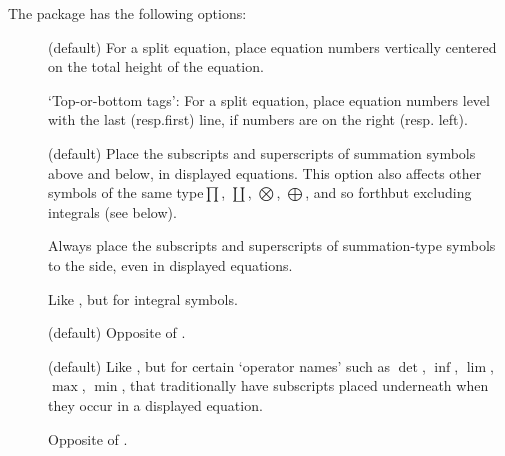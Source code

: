 \documentclass[leqno,titlepage,openany]{amsldoc}[1999/12/13]
\begin{document}
The  package has the following options:
\begin{description}

\item[] (default) For a split equation, place equation
numbers vertically centered
on the total height of the equation.

\item[] `Top-or-bottom tags': For a split equation, place
equation numbers level with
the last (resp.\@ first) line, if numbers are on the right (resp.\@
left).

\item[] (default) Place the subscripts and
superscripts\relax
{} of summation symbols
above and below, in displayed equations. This option also affects other
symbols of the same type\mdash $\prod$, $\coprod$, $\bigotimes$,
$\bigoplus$, and so forth\mdash but excluding integrals (see below).

\item[] Always place the subscripts and superscripts of
summation-type symbols to the side, even in displayed equations.

\item[] Like , but for
integral symbols.

\item[] (default) Opposite of .

\item[] (default) Like , but for certain
`operator names' such as $\det$, $\inf$, $\lim$, $\max$, $\min$, that
traditionally have subscripts  placed underneath when they occur in a displayed
equation.

\item[] Opposite of .

\end{description}

\begin{description}
\item[]
\item[]
\item[]
\end{description}
\end{document}
